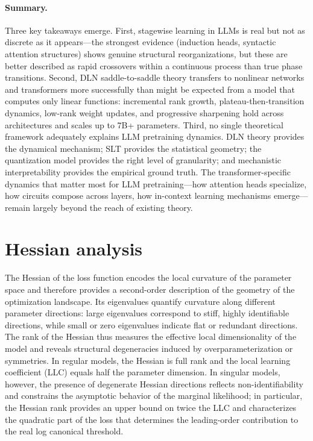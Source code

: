 \documentclass{article}
\theoremstyle{definition}
\begin{document}
\paragraph{Summary.} Three key takeaways emerge. First, stagewise learning in LLMs is real but not as discrete as it appears---the strongest evidence (induction heads, syntactic attention structures) shows genuine structural reorganizations, but these are better described as rapid crossovers within a continuous process than true phase transitions. Second, DLN saddle-to-saddle theory transfers to nonlinear networks and transformers more successfully than might be expected from a model that computes only linear functions: incremental rank growth, plateau-then-transition dynamics, low-rank weight updates, and progressive sharpening hold across architectures and scales up to 7B+ parameters. Third, no single theoretical framework adequately explains LLM pretraining dynamics. DLN theory provides the dynamical mechanism; SLT provides the statistical geometry; the quantization model provides the right level of granularity; and mechanistic interpretability provides the empirical ground truth. The transformer-specific dynamics that matter most for LLM pretraining---how attention heads specialize, how circuits compose across layers, how in-context learning mechanisms emerge---remain largely beyond the reach of existing theory.

\section{Hessian analysis}
The Hessian of the loss function encodes the local curvature of the parameter space and therefore provides a second-order description of the geometry of the optimization landscape. Its eigenvalues quantify curvature along different parameter directions: large eigenvalues correspond to stiff, highly identifiable directions, while small or zero eigenvalues indicate flat or redundant directions. The rank of the Hessian thus measures the effective local dimensionality of the model and reveals structural degeneracies induced by overparameterization or symmetries. In regular models, the Hessian is full rank and the local learning coefficient (LLC) equals half the parameter dimension. In singular models, however, the presence of degenerate Hessian directions reflects non-identifiability and constrains the asymptotic behavior of the marginal likelihood; in particular, the Hessian rank provides an upper bound on twice the LLC and characterizes the quadratic part of the loss that determines the leading-order contribution to the real log canonical threshold.
\end{document}
